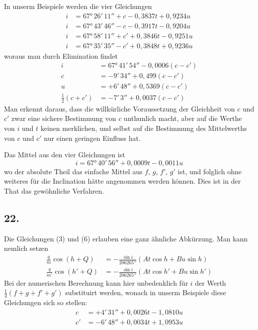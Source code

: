 \documentclass[12pt,a4paper]{article}
\begin{document}
In unserm Beispiele werden die vier Gleichungen
\begin{align*}
i &= 67°\,26'\,11'' + c - 0{,}3837 t + 0{,}9234 u \\
i &= 67°\,43'\,46'' - c - 0{,}3917 t - 0{,}9204 u \\
i &= 67°\,58'\,11'' + c' + 0{,}3846 t - 0{,}9251 u \\
i &= 67°\,35'\,35'' - c' + 0{,}3848 t + 0{,}9236 u
\end{align*}
woraus man durch Elimination findet
\begin{align*}
i &= 67°\,41'\,54'' - 0{,}0006 (c - c') \\
c &= -9'\,34'' + 0{,}499 (c - c') \\
u &= +6'\,48'' + 0{,}5369 (c - c') \\
\tfrac{1}{2}(c + c') &= -7'\,3'' + 0{,}0037 (c - c')
\end{align*}
Man erkennt daraus, dass die willkürliche Voraussetzung der Gleichheit von $c$ und $c'$ zwar eine sichere Bestimmung von $c$ unthunlich macht, aber auf die Werthe von $i$ und $t$ keinen merklichen, und selbst auf die Bestimmung des Mittelwerths von $c$ und $c'$ nur einen geringen Einfluss hat.

Das Mittel aus den vier Gleichungen ist
\[ i = 67°\,40'\,56'' + 0{,}0009 t - 0{,}0011 u \]
wo der absolute Theil das einfache Mittel aus $f$, $g$, $f'$, $g'$ ist, und folglich ohne weiteres für die Inclination hätte angenommen werden können. Dies ist in der That das gewöhnliche Verfahren.

\subsection*{22.}
Die Gleichungen (3) und (6) erlauben eine ganz ähnliche Abkürzung. Man kann nemlich setzen
\begin{align*}
\frac{q}{m} \cos(h + Q) &= -\frac{\sin i}{206265''} (A t \cos h + B u \sin h) \\
\frac{q}{m'} \cos(h' + Q) &= -\frac{\sin i}{206265''} (A t \cos h' + B u \sin h')
\end{align*}
Bei der numerischen Berechnung kann hier unbedenklich für $i$ der Werth $\tfrac{1}{4}(f + g + f' + g')$ substituirt werden, wonach in unserm Beispiele diese Gleichungen sich so stellen:
\begin{align*}
c &= +4'\,31'' + 0{,}0026 t - 1{,}0810 u \\
c' &= -6'\,48'' + 0{,}0034 t + 1{,}0953 u
\end{align*}
\end{document}
